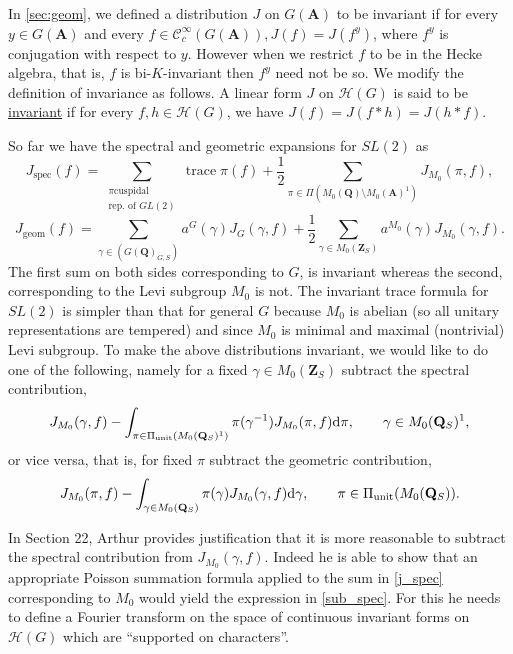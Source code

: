 \documentclass{ims9x6}
\def\A{\mathbf A}
\def\Q{\mathbf Q}
\def\Z{\mathbf Z}
\def\CCC{\mathcal C}
\def\HHH{\mathcal H}
\def\d{\text d}
\def\bs{\setminus}
\def\trace{\operatorname{trace}}
\begin{document}
In \cref{sec:geom}, we defined a distribution $J$ on $G(\A)$ to be invariant if for every $y \in G(\A)$ and every $f \in \CCC_c^\infty(G(\A)), J(f) = J(f^y)$, where $f^y$ is conjugation with respect to $y$. However when we restrict $f$ to be in the Hecke algebra, that is, $f$ is bi-$K$-invariant then $f^y$ need not be so. We modify the definition of invariance as follows. A linear form $J$ on $\HHH(G)$ is said to be \underline{invariant} if for every $f, h \in \HHH(G)$, we have $J(f) = J(f*h) = J(h*f)$.

So far we have the spectral and geometric expansions for $SL(2)$ as
\begin{equation} \label{j_spec}
	J_{\text{spec}}(f) = \sum_{\substack{\pi \text{cuspidal} \\ \text{rep. of } GL(2)}} \trace \pi(f) + \frac{1}{2} \sum_{\pi \in \Pi(M_0(\Q) \bs M_0(\A)^1)} J_{M_0}(\pi, f), 
\end{equation}
\begin{equation} \label{j_geom}
	J_{\text{geom}}(f) = \sum_{\gamma \in (G(\Q)_{G, S})} a^G(\gamma) J_G(\gamma, f) + \frac{1}{2} \sum_{\gamma \in M_0(\Z_S)} a^{M_0}(\gamma) J_{M_0}(\gamma, f). 
\end{equation}
The first sum on both sides corresponding to $G$, is invariant whereas the second, corresponding to the Levi subgroup $M_0$ is not. The invariant trace formula for $SL(2)$ is simpler than that for general $G$ because $M_0$ is abelian (so all unitary representations are tempered) and since $M_0$ is minimal and maximal (nontrivial) Levi subgroup. To make the above distributions invariant, we would like to do one of the following, namely for a fixed $\gamma \in M_0(\Z_S)$ subtract the spectral contribution, 
\begin{equation} \label{sub_spec}
J_{M_0}(\gamma, f) - \int_{\pi \in \Pi_{\text{unit}}(M_0(\Q_S)^1)} \pi(\gamma^{-1}) J_{M_0}(\pi, f) \d \pi, \qquad \gamma \in M_0(\Q_S)^1,
\end{equation}
or vice versa, that is, for fixed $\pi$ subtract the geometric contribution,
\[ J_{M_0}(\pi, f) - \int_{\gamma \in M_0(\Q_S)} \pi(\gamma) J_{M_0}(\gamma, f) \d \gamma, \qquad \pi \in \Pi_{\text{unit}}(M_0(\Q_S)). \]

In Section 22, Arthur provides justification that it is more reasonable to subtract the spectral contribution from $J_{M_0}(\gamma, f)$. Indeed he is able to show that an appropriate Poisson summation formula applied to the sum in \cref{j_spec} corresponding to $M_0$ would yield the expression in \cref{sub_spec}. For this he needs to define a Fourier transform on the space of continuous invariant forms on $\HHH(G)$ which are ``supported on characters''. 
\end{document}
